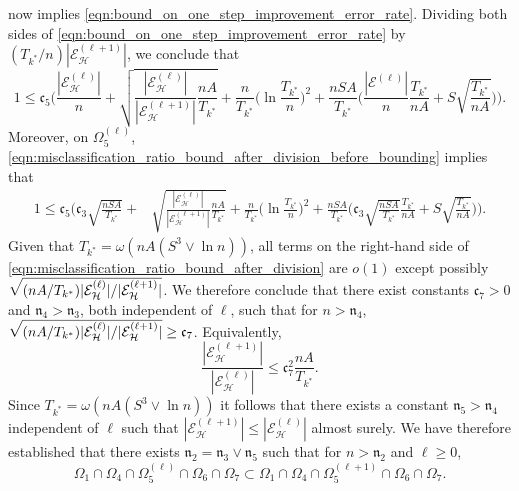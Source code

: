 \documentclass[11pt]{article}
\newcommand{\mf}[1]{\mathfrak{#1}}
\newcommand{\mcE}{\mathcal{E}}
\newcommand{\mcH}{\mathcal{H}}
\theoremstyle{definition}
\theoremstyle{definition}
\begin{document}
 now implies \eqref{eqn:bound_on_one_step_improvement_error_rate}.
Dividing both sides of \eqref{eqn:bound_on_one_step_improvement_error_rate} by $(T_{k^*}/n)\allowbreak |\mcE_{\mcH}^{(\ell+1)}|$, we conclude that
\begin{equation}
	\label{eqn:misclassification_ratio_bound_after_division_before_bounding}
	1 \leq
	\mf{c}_5
	\biggl(
	\frac{|\mcE_{\mcH}^{(\ell)}|}{n}
	+
	\sqrt{\frac{|\mcE_{\mcH}^{(\ell)}|}{|\mcE_{\mcH}^{(\ell+1)}|}\frac{nA}{T_{k^*}}}
	+
	\frac{n}{T_{k^*}}
	\biggl(\ln\frac{T_{k^*}}{n}\biggr)^2
	+
	\frac{nSA}{T_{k^*}}
	\biggl(
	\frac{|\mcE^{(\ell)}|}{n}
	\frac{T_{k^*}}{nA}
	+
	S\sqrt{\frac{T_{k^*}}{nA}}
	\biggr)
	\biggr)
	.
\end{equation}
Moreover, on $\Omega_5^{(\ell)}$, \eqref{eqn:misclassification_ratio_bound_after_division_before_bounding} implies that
\begin{equation}
	\label{eqn:misclassification_ratio_bound_after_division}
	\begin{split}
		1
		\leq
		\mf{c}_5
		\biggl(
		\mf{c}_3\sqrt{\frac{nSA}{T_{k^*}}}
		+
		 &
		\sqrt{\frac{|\mcE_{\mcH}^{(\ell)}|}{|\mcE_{\mcH}^{(\ell+1)}|}\frac{nA}{T_{k^*}}}
		+
		\frac{n}{T_{k^*}}
		\biggl(\ln\frac{T_{k^*}}{n}\biggr)^2
		+
		\frac{nSA}{T_{k^*}}
		\biggl(
		\mf{c}_3\sqrt{\frac{nSA}{T_{k^*}}}\frac{T_{k^*}}{nA}
		+
		S\sqrt{\frac{T_{k^*}}{nA}}
		\biggr)
		\biggr)
		.
	\end{split}
\end{equation}
Given that $T_{k^*}=\omega(nA(S^3\vee \ln n))$, all terms on the right-hand side of \eqref{eqn:misclassification_ratio_bound_after_division} are $o(1)$ except possibly $\sqrt{\smash[b]{(nA/T_{k^*})|\mcE_{\mcH}^{(\ell)}|/|\mcE_{\mcH}^{(\ell+1)}|}}$.
We therefore conclude that there exist constants $\mf{c}_7>0$ and $\mf{n}_4>\mf{n}_3$, both independent of $\ell$, such that for $n>\mf{n}_4$, $\sqrt{\smash[b]{(nA/T_{k^*})|\mcE_{\mcH}^{(\ell)}|/|\mcE_{\mcH}^{(\ell+1)}|}}\geq \mf{c}_7$.
Equivalently,
\begin{equation}
	\label{eqn:misclassification_ratio_bound}
	\frac{|\mcE^{(\ell+1)}_{\mcH}|}{|\mcE^{(\ell)}_{\mcH}|}
	\leq
	\mf{c}_7^2\frac{nA}{T_{k^*}}
	.
\end{equation}
Since $T_{k^*}=\omega(nA(S^3\vee \ln n))$ it follows that there exists a constant $\mf{n}_5>\mf{n}_4$ independent of $\ell$ such that $|\mcE^{(\ell+1)}_{\mcH}|\leq |\mcE^{(\ell)}_{\mcH}|$ almost surely.
We have therefore established that there exists $\mf{n}_2=\mf{n}_3\vee \mf{n}_5$ such that for $n>\mf{n}_2$ and $\ell\geq 0$,
\begin{equation}
	\label{eqn:intermediate_event_inclusion}
	\Omega_1\cap\Omega_4\cap\Omega_5^{(\ell)}\cap\Omega_6\cap\Omega_7
	\subset
	\Omega_1\cap\Omega_4\cap\Omega_5^{(\ell+1)}\cap\Omega_6\cap\Omega_7
	.
\end{equation}
\end{document}
